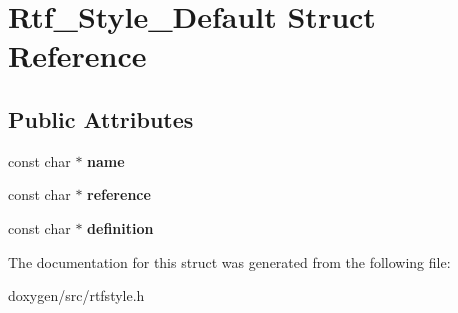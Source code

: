 \hypertarget{struct_rtf___style___default}{}\section{Rtf\+\_\+\+Style\+\_\+\+Default Struct Reference}
\label{struct_rtf___style___default}
\subsection*{Public Attributes}
\begin{DoxyCompactItemize}
\item 
\mbox{\label{struct_rtf___style___default_a6e3e9ffcccb14d865f1615b58b9e63a0}} 
const char $\ast$ {\bfseries name}
\item 
\mbox{\label{struct_rtf___style___default_aba6478eff992fe32a526e6a7bb7571ca}} 
const char $\ast$ {\bfseries reference}
\item 
\mbox{\label{struct_rtf___style___default_acab47ece3f92bcef2c1120043251e426}} 
const char $\ast$ {\bfseries definition}
\end{DoxyCompactItemize}


The documentation for this struct was generated from the following file\+:\begin{DoxyCompactItemize}
\item 
doxygen/src/rtfstyle.\+h\end{DoxyCompactItemize}
